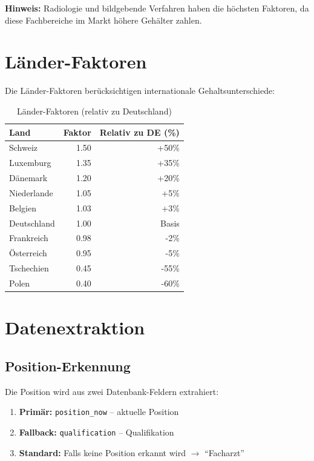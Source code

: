 \documentclass[12pt,a4paper]{article}
\begin{document}
\textbf{Hinweis:} Radiologie und bildgebende Verfahren haben die höchsten Faktoren, da diese Fachbereiche im Markt höhere Gehälter zahlen.

\section{Länder-Faktoren}

Die Länder-Faktoren berücksichtigen internationale Gehaltsunterschiede:

\begin{table}[h]
\centering
\begin{tabular}{@{}lrr@{}}
\toprule
\textbf{Land} & \textbf{Faktor} & \textbf{Relativ zu DE (\%)} \\
\midrule
Schweiz & 1.50 & +50\% \\
Luxemburg & 1.35 & +35\% \\
Dänemark & 1.20 & +20\% \\
Niederlande & 1.05 & +5\% \\
Belgien & 1.03 & +3\% \\
Deutschland & 1.00 & Basis \\
Frankreich & 0.98 & -2\% \\
Österreich & 0.95 & -5\% \\
Tschechien & 0.45 & -55\% \\
Polen & 0.40 & -60\% \\
\bottomrule
\end{tabular}
\caption{Länder-Faktoren (relativ zu Deutschland)}
\label{tab:laender}
\end{table}

\section{Datenextraktion}

\subsection{Position-Erkennung}

Die Position wird aus zwei Datenbank-Feldern extrahiert:
\begin{enumerate}
    \item \textbf{Primär:} \texttt{position\_now} -- aktuelle Position
    \item \textbf{Fallback:} \texttt{qualification} -- Qualifikation
    \item \textbf{Standard:} Falls keine Position erkannt wird $\rightarrow$ ``Facharzt''
\end{enumerate}
\end{document}
